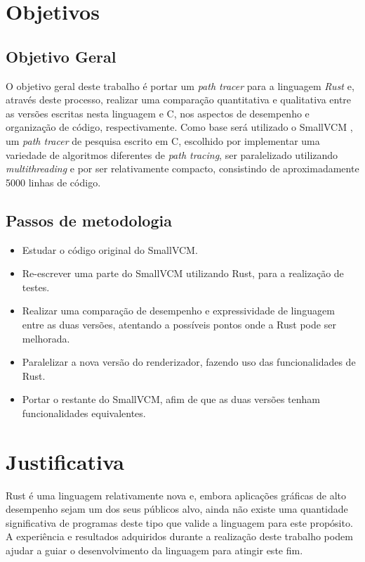 \documentclass[tg]{mdtufsm}
\def\Cpp{{C\nolinebreak[4]\raisebox{.20ex}{\small\bf++}}}
\begin{document}
\section{Objetivos}

\subsection{Objetivo Geral}

O objetivo geral deste trabalho é portar um \emph{path tracer} para a linguagem \emph{Rust} e, através deste processo,
realizar uma comparação quantitativa e qualitativa entre as versões escritas nesta linguagem e \Cpp, nos aspectos de
desempenho e organização de código, respectivamente. Como base será utilizado o SmallVCM \citep{smallvcm}, um
\emph{path tracer} de pesquisa escrito em \Cpp, escolhido por implementar uma variedade
de algoritmos diferentes de \emph{path tracing}, ser paralelizado utilizando \emph{multithreading} e por ser relativamente compacto, consistindo de
aproximadamente 5000 linhas de código.

\subsection{Passos de metodologia}
\begin{itemize}
	\item Estudar o código original do SmallVCM.
	\item Re-escrever uma parte do SmallVCM utilizando Rust, para a realização de
		testes.
	\item Realizar uma comparação de desempenho e expressividade de linguagem entre as duas versões,
		atentando a possíveis pontos onde a Rust pode ser melhorada.
	\item Paralelizar a nova versão do renderizador, fazendo uso das funcionalidades de Rust.
	\item Portar o restante do SmallVCM, afim de que as duas versões tenham funcionalidades
		equivalentes.
\end{itemize}

\section{Justificativa}

Rust é uma linguagem relativamente nova e, embora aplicações gráficas de alto desempenho sejam um
dos seus públicos alvo, ainda não existe uma quantidade significativa de programas deste tipo que
valide a linguagem para este propósito. A experiência e resultados adquiridos durante a realização
deste trabalho podem ajudar a guiar o desenvolvimento da linguagem para atingir este fim.
\end{document}
